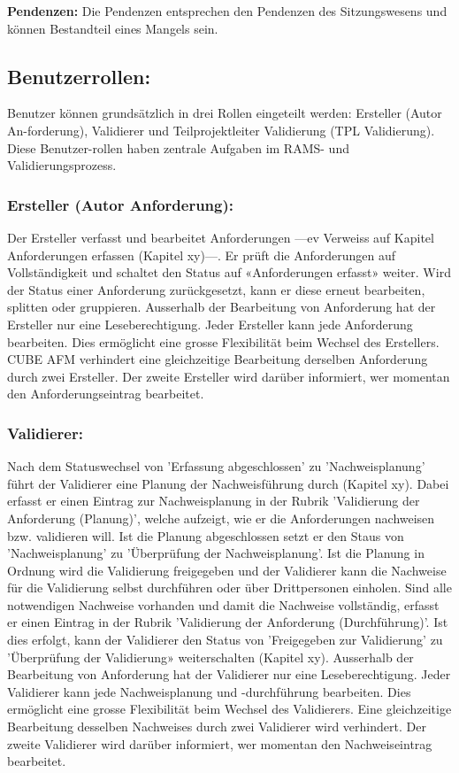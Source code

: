 \textbf{Pendenzen:} Die Pendenzen entsprechen den Pendenzen des Sitzungswesens und können Bestandteil eines Mangels sein. 

\vspace{\baselineskip}

\subsection{Benutzerrollen:} 
Benutzer können grundsätzlich in drei Rollen eingeteilt werden: Ersteller (Autor An-forderung), Validierer und Teilprojektleiter Validierung (TPL Validierung). Diese Benutzer-rollen haben zentrale Aufgaben im RAMS- und Validierungsprozess.

\subsubsection{Ersteller (Autor Anforderung):} 
Der Ersteller verfasst und bearbeitet Anforderungen ---ev Verweiss auf Kapitel Anforderungen erfassen (Kapitel xy)---. Er prüft die Anforderungen auf Vollständigkeit und schaltet den Status auf «Anforderungen erfasst» weiter. Wird der Status einer Anforderung zurückgesetzt, kann er diese erneut bearbeiten, splitten oder gruppieren. 
Ausserhalb der Bearbeitung von Anforderung hat der Ersteller nur eine Leseberechtigung. Jeder Ersteller kann jede Anforderung bearbeiten. Dies ermöglicht eine grosse Flexibilität beim Wechsel des Erstellers. CUBE AFM verhindert eine gleichzeitige Bearbeitung derselben Anforderung durch zwei Ersteller. Der zweite Ersteller wird darüber informiert, wer momentan den Anforderungseintrag bearbeitet. 

\subsubsection{Validierer:} 
Nach dem Statuswechsel von 'Erfassung abgeschlossen' zu 'Nachweisplanung' führt der Validierer eine Planung der Nachweisführung durch (Kapitel xy). Dabei erfasst er einen Eintrag zur Nachweisplanung in der Rubrik 'Validierung der Anforderung (Planung)', welche aufzeigt, wie er die Anforderungen nachweisen bzw. validieren will. Ist die Planung abgeschlossen setzt er den Staus von 'Nachweisplanung' zu 'Überprüfung der Nachweisplanung'. 
Ist die Planung in Ordnung wird die Validierung freigegeben und der Validierer kann die Nachweise für die Validierung selbst durchführen oder über Drittpersonen einholen. Sind alle notwendigen Nachweise vorhanden und damit die Nachweise vollständig, erfasst er einen Eintrag in der Rubrik 'Validierung der Anforderung (Durchführung)'. Ist dies erfolgt, kann der Validierer den Status von 'Freigegeben zur Validierung' zu 'Überprüfung der Validierung» weiterschalten (Kapitel xy). 
Ausserhalb der Bearbeitung von Anforderung hat der Validierer nur eine Leseberechtigung. Jeder Validierer kann jede Nachweisplanung und -durchführung bearbeiten. Dies ermöglicht eine grosse Flexibilität beim Wechsel des Validierers. Eine gleichzeitige Bearbeitung desselben Nachweises durch zwei Validierer wird verhindert. Der zweite Validierer wird darüber informiert, wer momentan den Nachweiseintrag bearbeitet.








